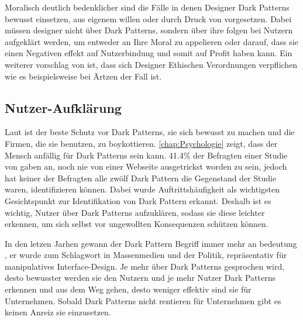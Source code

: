 \documentclass[conference,compsoc,final,a4paper]{IEEEtran}
\begin{document}
Moralisch deutlich bedenklicher sind die Fälle in denen Designer Dark Patterns bewusst einsetzen, aus eigenem willen oder durch Druck von vorgesetzen. Dabei müssen designer nicht über Dark Patterns, sondern über ihre folgen bei Nutzern aufgeklärt werden, um entweder an Ihre Moral zu appelieren oder darauf, dass sie einen Negativen effekt auf Nutzerbindung und somit auf Profit haben kann. Ein weiterer vorschlag von \citeauthor*{Gray_2018} \autocite{Gray_2018} ist, dass sich Designer Ethischen Verordnungen verpflichen wie es beispielsweise bei Ärtzen der Fall ist. 

\subsection{Nutzer-Aufklärung}
Laut \citeauthor{Brignull} \autocite{Brignull} ist der beste Schutz vor Dark Patterns, sie sich bewusst zu machen und die Firmen, die sie benutzen, zu boykottieren. \autoref{chap:Psychologie} zeigt, dass der Mensch anfällig für Dark Patterns sein kann. 41.4\% der Befragten einer Studie von \citeauthor{M.Bhoot2020} \autocite{M.Bhoot2020} gaben an, noch nie von einer Webseite ausgetrickst worden zu sein, jedoch hat keiner der Befragten alle zwölf Dark Pattern die Gegenstand der Studie waren, identifizieren können. Dabei wurde Auftrittshäufigkeit als wichtigsten Gesichtspunkt zur Identifikation von Dark Pattern erkannt. Deshalb ist es wichtig, Nutzer über Dark Patterns aufzuklären, sodass sie diese leichter erkennen, um sich selbst vor ungewollten Konsequenzen schützen können.

In den letzen Jarhen gewann der Dark Pattern Begriff immer mehr an bedeutung \autocite{Chivukula_2019}, er wurde zum Schlagwort in Massenmedien und der Politik, repräsentativ für manipulatives Interface-Design. Je mehr über Dark Patterns gesprochen wird, desto bewusster werden sie den Nutzern und je mehr Nutzer Dark Patterns erkennen und aus dem Weg gehen, desto weniger effektiv sind sie für Unternehmen. Sobald Dark Patterns nicht rentieren für Unternehmen gibt es keinen Anreiz sie einzusetzen.
\end{document}
